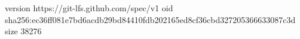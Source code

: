 version https://git-lfs.github.com/spec/v1
oid sha256:ec36ff081e7bd6acdb29bd84410fdb202165ed8cf36cbd327205366633087c3d
size 38276
